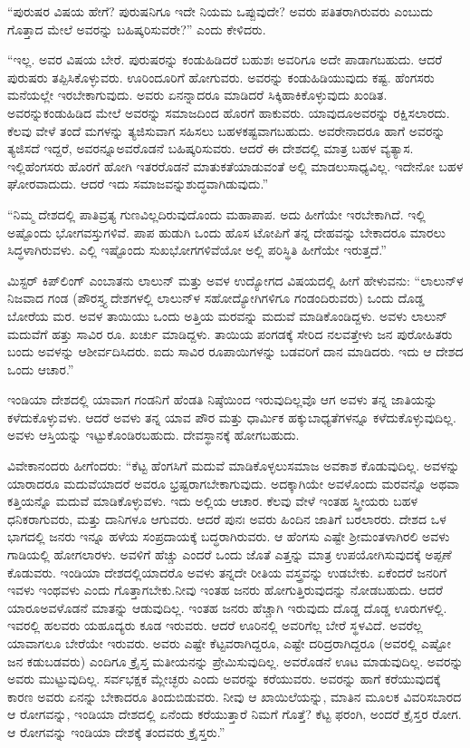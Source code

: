 “ಪುರುಷರ ವಿಷಯ ಹೇಗೆ? ಪುರುಷನಿಗೂ ಇದೇ ನಿಯಮ ಒಪ್ಪುವುದೇ? ಅವರು ಪತಿತರಾಗಿರುವರು ಎಂಬುದು ಗೊತ್ತಾದ ಮೇಲೆ ಅವರನ್ನು ಬಹಿಷ್ಕರಿಸುವರೇ?” ಎಂದು ಕೇಳಿದರು.

“ಇಲ್ಲ. ಅವರ ವಿಷಯ ಬೇರೆ. ಪುರುಷರನ್ನು ಕಂಡುಹಿಡಿದರೆ ಬಹುಶಃ ಅವರಿಗೂ ಅದೇ ಪಾಡಾಗಬಹುದು. ಆದರೆ ಪುರುಷರು ತಪ್ಪಿಸಿಕೊಳ್ಳುವರು. ಊರಿಂದೂರಿಗೆ ಹೋಗುವರು. ಅವರನ್ನು ಕಂಡುಹಿಡಿಯುವುದು ಕಷ್ಟ. ಹೆಂಗಸರು ಮನೆಯಲ್ಲೇ ಇರಬೇಕಾಗುವುದು. ಅವರು ಏನನ್ನಾದರೂ ಮಾಡಿದರೆ ಸಿಕ್ಕಿಹಾಕಿಕೊಳ್ಳುವುದು ಖಂಡಿತ. ಅವರನ್ನು\break ಕಂಡುಹಿಡಿದ ಮೇಲೆ ಅವರನ್ನು ಸಮಾಜದಿಂದ ಹೊರಗೆ ಹಾಕುವರು. ಯಾವುದೂ\break ಅವರನ್ನು ರಕ್ಷಿಸಲಾರದು. ಕೆಲವು ವೇಳೆ ತಂದೆ ಮಗಳನ್ನು ತ್ಯಜಿಸುವಾಗ ಸಹಿಸಲು ಬಹಳ\break ಕಷ್ಟವಾಗಬಹುದು. ಅವರೇನಾದರೂ ಹಾಗೆ ಅವರನ್ನು ತ್ಯಜಿಸದೆ ಇದ್ದರೆ, ಅವರನ್ನೂ\break ಅವರೊಡನೆ ಬಹಿಷ್ಕರಿಸುವರು. ಆದರೆ ಈ ದೇಶದಲ್ಲಿ ಮಾತ್ರ ಬಹಳ ವ್ಯತ್ಯಾಸ. ಇಲ್ಲಿ\break ಹೆಂಗಸರು ಹೊರಗೆ ಹೋಗಿ ಇತರರೊಡನೆ ಮಾತುಕತೆಯಾಡುವಂತೆ ಅಲ್ಲಿ ಮಾಡಲು\break ಸಾಧ್ಯವಿಲ್ಲ. ಇದೇನೋ ಬಹಳ ಘೋರವಾದುದು. ಆದರೆ ಇದು ಸಮಾಜವನ್ನು\break ಶುದ್ಧವಾಗಿಡುವುದು.”

“ನಿಮ್ಮ ದೇಶದಲ್ಲಿ ಪಾತಿವ್ರತ್ಯ ಗುಣವಿಲ್ಲದಿರುವುದೊಂದು ಮಹಾಪಾಪ. ಅದು ಹೀಗೆಯೇ ಇರಬೇಕಾಗಿದೆ. ಇಲ್ಲಿ ಅಷ್ಟೊಂದು ಭೋಗವಸ್ತುಗಳಿವೆ. ಪಾಪ ಹುಡುಗಿ ಒಂದು ಹೊಸ ಟೋಪಿಗೆ ತನ್ನ ದೇಹವನ್ನು ಬೇಕಾದರೂ ಮಾರಲು ಸಿದ್ಧಳಾಗಿರುವಳು. ಎಲ್ಲಿ ಇಷ್ಟೊಂದು ಸುಖಭೋಗಗಳಿವೆಯೋ ಅಲ್ಲಿ ಪರಿಸ್ಥಿತಿ ಹೀಗೆಯೇ ಇರುತ್ತದೆ.”

ಮಿಸ್ಟರ್​ ಕಿಪ್​ಲಿಂಗ್​ ಎಂಬಾತನು ಲಾಲುನ್​ ಮತ್ತು ಅವಳ ಉದ್ಯೋಗದ ವಿಷಯದಲ್ಲಿ ಹೀಗೆ ಹೇಳುವನು: “ಲಾಲುನ್​ಳ ನಿಜವಾದ ಗಂಡ (ಪೌರಸ್ತ್ಯ ದೇಶಗಳಲ್ಲಿ ಲಾಲುನ್​ಳ ಸಹೋದ್ಯೋಗಿಗಳಿಗೂ ಗಂಡಂದಿರುವರು) ಒಂದು ದೊಡ್ಡ ಬೋರೆಯ ಮರ. ಅವಳ ತಾಯಿಯು ಒಂದು ಅತ್ತಿಯ ಮರವನ್ನು ಮದುವೆ ಮಾಡಿಕೊಂಡಿದ್ದಳು. ಅವಳು ಲಾಲುನ್​ ಮದುವೆಗೆ ಹತ್ತು ಸಾವಿರ ರೂ. ಖರ್ಚು ಮಾಡಿದ್ದಳು. ತಾಯಿಯ ಪಂಗಡಕ್ಕೆ ಸೇರಿದ ನಲವತ್ತೇಳು ಜನ ಪುರೋಹಿತರು ಬಂದು ಅವಳನ್ನು ಆಶೀರ್ವದಿಸಿದರು. ಐದು ಸಾವಿರ ರೂಪಾಯಿಗಳನ್ನು ಬಡವರಿಗೆ ದಾನ ಮಾಡಿದರು. ಇದು ಆ ದೇಶದ ಒಂದು ಆಚಾರ.”

ಇಂಡಿಯಾ ದೇಶದಲ್ಲಿ ಯಾವಾಗ ಗಂಡನಿಗೆ ಹೆಂಡತಿ ನಿಷ್ಠೆಯಿಂದ ಇರುವುದಿಲ್ಲವೊ ಆಗ ಅವಳು ತನ್ನ ಜಾತಿಯನ್ನು ಕಳೆದುಕೊಳ್ಳುವಳು. ಆದರೆ ಅವಳು ತನ್ನ ಯಾವ ಪೌರ ಮತ್ತು ಧಾರ್ಮಿಕ ಹಕ್ಕುಬಾಧ್ಯತೆಗಳನ್ನೂ ಕಳೆದುಕೊಳ್ಳುವುದಿಲ್ಲ. ಅವಳು ಆಸ್ತಿಯನ್ನು ಇಟ್ಟುಕೊಂಡಿರಬಹುದು. ದೇವಸ್ಥಾನಕ್ಕೆ ಹೋಗಬಹುದು.

\eject

ವಿವೇಕಾನಂದರು ಹೀಗೆಂದರು: “ಕೆಟ್ಟ ಹೆಂಗಸಿಗೆ ಮದುವೆ ಮಾಡಿಕೊಳ್ಳಲು\break ಸಮಾಜ ಅವಕಾಶ ಕೊಡುವುದಿಲ್ಲ. ಅವಳನ್ನು ಯಾರಾದರೂ ಮದುವೆಯಾದರೆ ಅವರೂ ಭ್ರಷ್ಟರಾಗಬೇಕಾಗುವುದು. ಅದಕ್ಕಾಗಿಯೇ ಅವಳೊಂದು ಮರವನ್ನೊ ಅಥವಾ ಕತ್ತಿಯನ್ನೊ ಮದುವೆ ಮಾಡಿಕೊಳ್ಳುವಳು. ಇದು ಅಲ್ಲಿಯ ಆಚಾರ. ಕೆಲವು ವೇಳೆ ಇಂತಹ ಸ್ತ್ರೀಯರು ಬಹಳ ಧನಿಕರಾಗುವರು, ಮತ್ತು ದಾನಿಗಳೂ ಆಗುವರು. ಆದರೆ ಪುನಃ ಅವರು ಹಿಂದಿನ ಜಾತಿಗೆ ಬರಲಾರರು. ದೇಶದ ಒಳ ಭಾಗದಲ್ಲಿ ಜನರು ಇನ್ನೂ ಹಳೆಯ ಸಂಪ್ರದಾಯಕ್ಕೆ ಬದ್ಧರಾಗಿರುವರು. ಆ ಹೆಂಗಸು ಎಷ್ಟೇ ಶ‍್ರೀಮಂತಳಾಗಿರಲಿ ಅವಳು ಗಾಡಿಯಲ್ಲಿ ಹೋಗಲಾರಳು. ಅವಳಿಗೆ ಹೆಚ್ಚು ಎಂದರೆ ಒಂದು ಜೊತೆ ಎತ್ತನ್ನು ಮಾತ್ರ ಉಪಯೋಗಿಸುವುದಕ್ಕೆ ಅಪ್ಪಣೆ ಕೊಡುವರು. ಇಂಡಿಯಾ ದೇಶದಲ್ಲಿಯಾದರೊ ಅವಳು ತನ್ನದೇ ರೀತಿಯ ವಸ್ತ್ರವನ್ನು ಉಡಬೇಕು. ಏಕೆಂದರೆ ಜನರಿಗೆ ಇವಳು ಇಂಥವಳು ಎಂದು ಗೊತ್ತಾಗಬೇಕು.\break ನೀವು ಇಂತಹ ಜನರು ಹೋಗುತ್ತಿರುವುದನ್ನು ನೋಡಬಹುದು. ಆದರೆ ಯಾರೂ\break ಅವಳೊಡನೆ ಮಾತನ್ನು ಆಡುವುದಿಲ್ಲ. ಇಂತಹ ಜನರು ಹೆಚ್ಚಾಗಿ ಇರುವುದು ದೊಡ್ಡ ದೊಡ್ಡ ಊರುಗಳಲ್ಲಿ. ಇವರಲ್ಲಿ ಹಲವರು ಯಹೂದ್ಯರು ಕೂಡ ಇರುವರು. ಆದರೆ ಊರಿನಲ್ಲಿ ಅವರಿಗೆಲ್ಲ ಬೇರೆ ಸ್ಥಳವಿದೆ. ಅವರೆಲ್ಲ ಯಾವಾಗಲೂ ಬೇರೆಯೇ ಇರುವರು. ಅವರು ಎಷ್ಟೇ ಕೆಟ್ಟವರಾಗಿದ್ದರೂ, ಎಷ್ಟೇ ದರಿದ್ರರಾಗಿದ್ದರೂ (ಅವರಲ್ಲಿ ಎಷ್ಟೋ ಜನ ಕಡುಬಡವರು) ಎಂದಿಗೂ ಕ್ರೈಸ್ತ ಮತೀಯನನ್ನು ಪ್ರೇಮಿಸುವುದಿಲ್ಲ. ಅವರೊಡನೆ ಊಟ ಮಾಡುವುದಿಲ್ಲ. ಅವರನ್ನು ಅವರು ಮುಟ್ಟುವುದಿಲ್ಲ. ಸರ್ವಭಕ್ಷಕ ಮ್ಲೇಚ್ಛರು ಎಂದು ಅವರನ್ನು ಕರೆಯುವರು. ಅವರನ್ನು ಹಾಗೆ ಕರೆಯುವುದಕ್ಕೆ ಕಾರಣ ಅವರು ಏನನ್ನು ಬೇಕಾದರೂ ತಿಂದುಬಿಡುವರು. ನೀವು ಆ ಖಾಯಿಲೆಯನ್ನು, ಮಾತಿನ ಮೂಲಕ ವಿವರಿಸಬಾರದ ಆ ರೋಗವನ್ನು, ಇಂಡಿಯಾ ದೇಶದಲ್ಲಿ ಏನೆಂದು ಕರೆಯುತ್ತಾರೆ ನಿಮಗೆ ಗೊತ್ತೆ? ಕೆಟ್ಟ ಫರಂಗಿ, ಅಂದರೆ ಕ್ರೈಸ್ತರ ರೋಗ. ಆ ರೋಗವನ್ನು ಇಂಡಿಯಾ ದೇಶಕ್ಕೆ ತಂದವರು ಕ್ರೈಸ್ತರು.”

